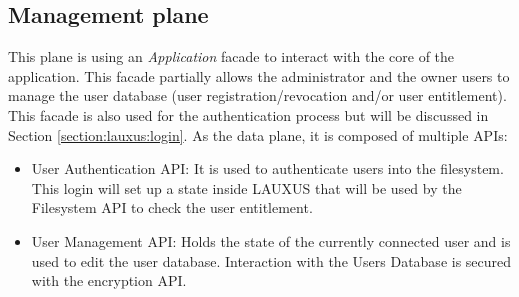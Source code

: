 \documentclass[../main.tex]{subfiles}
\begin{document}
\subsection{Management plane}
\label{section:lauxus:architecture_mgmntplane}
\par This plane is using an \textit{Application} facade to interact with the core of the application. This facade partially allows the administrator and the owner users to manage the user database (user registration/revocation and/or user entitlement). This facade is also used for the authentication process but will be discussed in Section \ref{section:lauxus:login}. As the data plane, it is composed of multiple APIs:
\begin{itemize}
    \item User Authentication API: It is used to authenticate users into the filesystem. This login will set up a state inside LAUXUS that will be used by the Filesystem API to check the user entitlement.
    \item User Management API: Holds the state of the currently connected user and is used to edit the user database. Interaction with the Users Database is secured with the encryption API.
\end{itemize}
\end{document}
